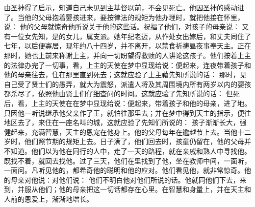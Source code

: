 由圣神得了启示，知道自己未见到主基督以前，不会见死亡。他因圣神的感动进了。当他的父母抱着婴孩进来，要按律法的规矩为他办理时，就把他接在怀里，说： 他的父母就惊奇他所说关于他的这些话。祝福了他们，对孩子的母亲说： 又有一位女先知，是的女儿，属支派。她年纪老迈，从作处女出嫁后，和丈夫同住了七年，以后便寡居，现年约八十四岁，并不离开，以禁食祈祷昼夜事奉天主。正在那时，她也上前来称谢上主，并向一切盼望得救赎的人讲论这孩子。他们按着上主的法律办完了一切事，看，上主的天使在梦中显现给说：便起来，连夜带着孩子和他的母亲往去，住在那里直到死去；这就应验了上主藉先知所说的话： 那时，见自己受了贤士们的愚弄，就大为震怒，派遣人将及其周围境内所有两岁以内的婴孩都杀尽了，依照他由贤士们仔细查问的时间。这就应验了先知所说的话： 但死后，看，上主的天使在在梦中显现给说：便起来，带着孩子和他的母亲，进了地。只因他一听说继承他父亲作了王，就怕往那里去；并在梦中得到天主的指示，便往地区去了，来住在一座名叫的城，这就应验了先知们所说的： 孩子渐渐长大，强健起来，充满智慧，天主的恩宠在他身上。他的父母每年在逾越节上去。当他十二岁时，他们照节期的规矩上去。日子满了，他们回去时，孩童仍留在，他的父母并不知道。他们以为他在同行的人中，走了一天的路程，就在亲戚和熟人中寻找他。既找不着，就回去找他。过了三天，他们在里找到了他，坐在教师中间，一面听，一面问。凡听见他的，都希奇他的聪明和他的应对。他们看见他，就非常惊奇。他的母亲对他说：对他们说： 他们不明白他对他们所说的话。他就同他们下去，来到，并服从他们；他的母亲把这一切话都存在心里。在智慧和身量上，并在天主和人前的恩爱上，渐渐地增长。\par


